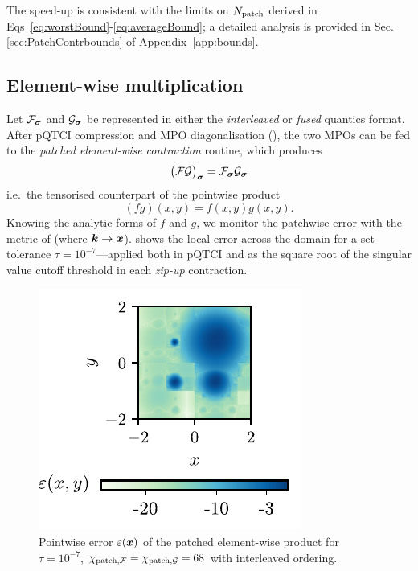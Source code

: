 The speed-up is consistent with the limits on $N_{\text{patch}}$ derived in Eqs~\eqref{eq:worstBound}-\eqref{eq:averageBound}; a detailed analysis is provided in Sec.\ref{sec:PatchContrbounds} of Appendix~\ref{app:bounds}.


\subsection{Element-wise multiplication}

Let \(\mathcal{F}_{\boldsymbol{\sigma}}\) and \(\mathcal{G}_{\boldsymbol{\sigma}}\) be represented in either the
\emph{interleaved} or \emph{fused} quantics format.  
After pQTCI compression and MPO diagonalisation
(), the two MPOs can be fed to the \emph{patched
element-wise contraction} routine, which produces
\begin{equation}
 \bigl(\mathcal{F}\mathcal{G}\bigr)_{\boldsymbol{\sigma}} = \mathcal{F}_{\boldsymbol{\sigma}}\mathcal{G}_{\boldsymbol{\sigma}}
 \label{eq:elemMulTensor}
\end{equation} 
i.e.\ the tensorised counterpart of the pointwise product 
\begin{equation}
    (fg)(x,y) = f(x,y)g(x,y).
\end{equation}
Knowing the analytic forms of \(f\) and \(g\), we monitor the patchwise error with the metric of  (where $\boldsymbol{k} \to \boldsymbol{x}$).  
 shows the local error across the domain for a set tolerance \(\tau=10^{-7}\)—applied both in pQTCI and as the square root of the singular value cutoff threshold in each \emph{zip-up} contraction.

\begin{figure}[htpb]
    \centering
    \includegraphics{figures/elemMulError.pdf}
    \caption{Pointwise error \(\varepsilon(\boldsymbol{x})\) of the patched element-wise product for \(\tau=10^{-7}\), $\chi_{\text{patch},\mathcal{F}} = \chi_{\text{patch},\mathcal{G}} = 68$ with interleaved ordering.}
    \label{fig:localErrorElemmul}
\end{figure}



